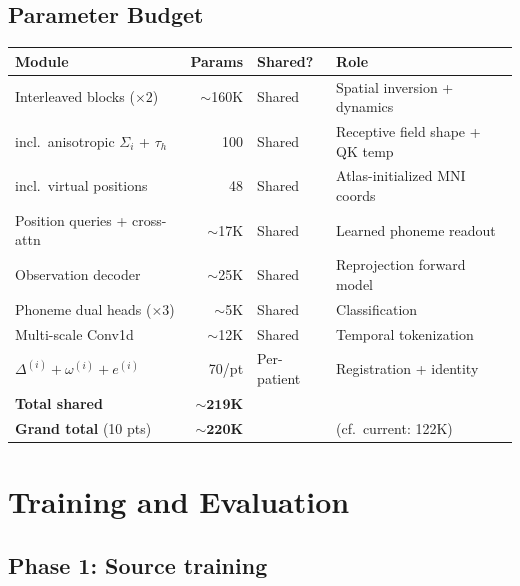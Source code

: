 \documentclass[11pt,letterpaper]{article}
\begin{document}
\subsection{Parameter Budget}

\begin{table}[ht!]\centering\small
\begin{tabular}{@{}lrll@{}}
\toprule
\textbf{Module} & \textbf{Params} & \textbf{Shared?} & \textbf{Role} \\
\midrule
Interleaved blocks ($\times 2$) & ${\sim}$160K & Shared & Spatial inversion + dynamics \\
\quad incl.\ anisotropic $\Sigma_i$ + $\tau_h$ & 100 & Shared & Receptive field shape + QK temp \\
\quad incl.\ virtual positions & 48 & Shared & Atlas-initialized MNI coords \\
Position queries + cross-attn & ${\sim}$17K & Shared & Learned phoneme readout \\
Observation decoder & ${\sim}$25K & Shared & Reprojection forward model \\
Phoneme dual heads ($\times 3$) & ${\sim}$5K & Shared & Classification \\
Multi-scale Conv1d & ${\sim}$12K & Shared & Temporal tokenization \\
\midrule
$\Delta^{(i)} + \omega^{(i)} + e^{(i)}$ & 70/pt & Per-patient & Registration + identity \\
\midrule
\textbf{Total shared} & $\mathbf{{\sim}219}$\textbf{K} & & \\
\textbf{Grand total} (10 pts) & $\mathbf{{\sim}220}$\textbf{K} & & (cf.\ current: 122K) \\
\bottomrule
\end{tabular}
\end{table}



\section{Training and Evaluation}\label{sec:training}

\subsection{Phase 1: Source training}
\end{document}
